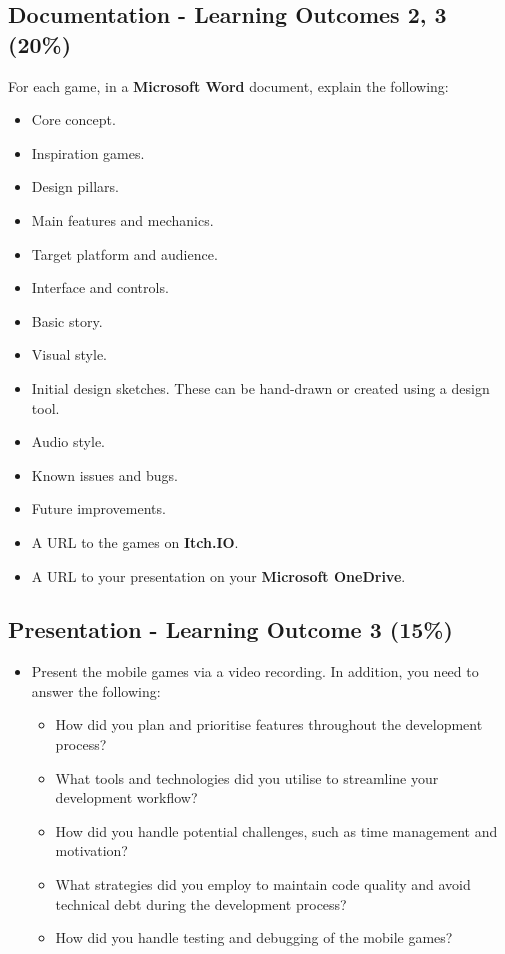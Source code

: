 \documentclass{article}
\begin{document}
\subsection*{Documentation - Learning Outcomes 2, 3 (20\%)}
For each game, in a \textbf{Microsoft Word} document, explain the following:
\begin{itemize}
	\item Core concept.
	\item Inspiration games.
	\item Design pillars.
	\item Main features and mechanics.
	\item Target platform and audience.
	\item Interface and controls.
	\item Basic story.
	\item Visual style.
	\item Initial design sketches. These can be hand-drawn or created using a design tool.
	\item Audio style.
	\item Known issues and bugs.
	\item Future improvements.
	\item A URL to the games on \textbf{Itch.IO}.
	\item A URL to your presentation on your \textbf{Microsoft OneDrive}.
\end{itemize}

\subsection*{Presentation - Learning Outcome 3 (15\%)} 
\begin{itemize}
	\item Present the mobile games via a video recording. In addition, you need to answer the following:
	\begin{itemize}
		\item How did you plan and prioritise features throughout the development process?
		\item What tools and technologies did you utilise to streamline your development workflow?
		\item How did you handle potential challenges, such as time management and motivation?
		\item What strategies did you employ to maintain code quality and avoid technical debt during the development process?
		\item How did you handle testing and debugging of the mobile games?
	\end{itemize}
\end{itemize}
\end{document}
